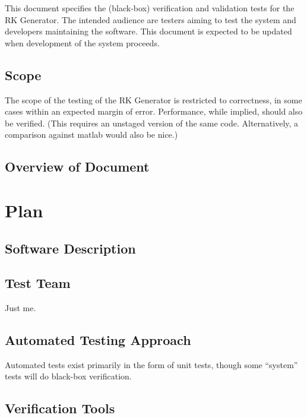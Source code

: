 \documentclass[12pt, titlepage]{article}
\begin{document}
This document specifies the (black-box) verification and validation tests for 
the RK Generator. The intended audience are testers aiming to test the system 
and developers maintaining the software. This document is expected to be 
updated when development of the system proceeds.

\subsection{Scope}

The scope of the testing of the RK Generator is restricted to correctness, in 
some cases within an expected margin of error. Performance, while implied, 
should also be verified. (This requires an unstaged version of the same code. 
Alternatively, a comparison against matlab would also be nice.)

\subsection{Overview of Document}

\section{Plan}
	
\subsection{Software Description}

\subsection{Test Team}

Just me.
\subsection{Automated Testing Approach}

Automated tests exist primarily in the form of unit tests, though some 
``system'' tests will do black-box verification.

\subsection{Verification Tools}
\end{document}
